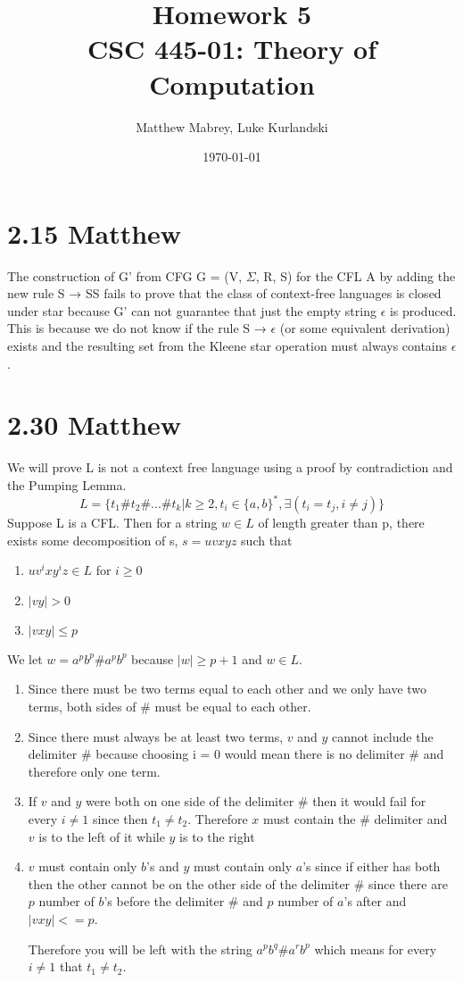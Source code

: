 \documentclass{article}
\title{Homework 5\\[0.2em]\smaller{}CSC 445-01: Theory of Computation}
\author{Matthew Mabrey, Luke Kurlandski}
\date{\today}
\begin{document}
\maketitle

\section*{2.15 Matthew}
The construction of G' from CFG G = (V, $\Sigma$, R, S) for the CFL A by adding the new rule S → SS fails to prove that the class of context-free languages is closed under star because G' can not guarantee that just the empty string $\epsilon$ is produced. This is because we do not know if the rule S → $\epsilon$ (or some equivalent derivation) exists  and the resulting set from the Kleene star operation must always contains $\epsilon$. 

\section*{2.30 Matthew}

We will prove L is not a context free language using a proof by contradiction and the Pumping Lemma.
$$L = \{ t_1\#t_2\#...\#t_k | k \geq 2, t_i \in \{ a, b\}^*, \exists ( t_i = t_j,  i \neq j ) \}$$
Suppose L is a CFL. Then for a string $w \in L$ of length greater than p, there exists some decomposition of s, $s = uvxyz$ such that 
\begin{enumerate}
    \item $uv^ixy^iz \in L$ for $i \geq 0$
    \item $|vy| > 0$
    \item $|vxy| \leq p$
\end{enumerate}

We let $w = a^pb^p\#a^pb^p$ because $|w| \geq p + 1$ and $w \in L$.

\begin{enumerate}
    \item Since there must be two terms equal to each other and we only have two terms, both sides of $\#$ must be equal to each other.
    \item Since there must always be at least two terms, $v$ and $y$ cannot include the delimiter $\#$ because choosing i = 0 would mean there is no delimiter $\#$ and therefore only one term.
    \item If $v$ and $y$ were both on one side of the delimiter $\#$ then it would fail for every $i \neq 1$ since then $t_1 \neq t_2$. Therefore $x$ must contain the $\#$ delimiter and $v$ is to the left of it while $y$ is to the right
    \item $v$ must contain only $b$'s and $y$ must contain only $a$'s since if either has both then the other cannot be on the other side of the delimiter $\#$ since there are $p$ number of $b$'s before the delimiter $\#$ and $p$ number of $a$'s after and $|vxy| <= p$.
    
    Therefore you will be left with the string $a^p b^q \# a^r b^p$ which means for every $i \neq 1$ that $t_1 \neq t_2$.
\end{enumerate}
\end{document}
